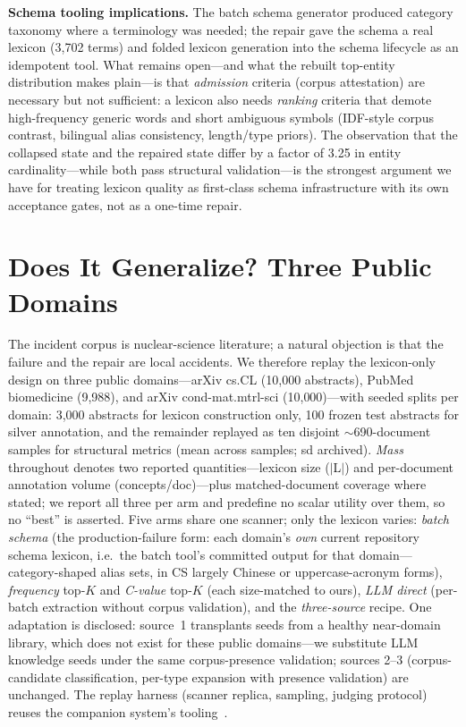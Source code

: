 \documentclass[preprint,12pt]{elsarticle}
\begin{document}
\textbf{Schema tooling implications.} The batch schema generator produced
category taxonomy where a terminology was needed; the repair gave the schema
a real lexicon (3{,}702 terms) and folded lexicon generation into the schema
lifecycle as an idempotent tool. What remains open---and what the rebuilt
top-entity distribution makes plain---is that \emph{admission} criteria
(corpus attestation) are necessary but not sufficient: a lexicon also needs
\emph{ranking} criteria that demote high-frequency generic words and short
ambiguous symbols (IDF-style corpus contrast, bilingual alias consistency,
length/type priors). The observation that the collapsed state and the
repaired state differ by a factor of 3.25 in entity cardinality---while both
pass structural validation---is the strongest argument we have for treating
lexicon quality as first-class schema infrastructure with its own acceptance
gates, not as a one-time repair.

\section{Does It Generalize? Three Public Domains}
\label{sec:xdomain}

The incident corpus is nuclear-science literature; a natural objection is
that the failure and the repair are local accidents. We therefore replay
the lexicon-only design on three public domains---arXiv cs.CL (10{,}000
abstracts), PubMed biomedicine (9{,}988), and arXiv cond-mat.mtrl-sci
(10{,}000)---with seeded splits per domain: 3{,}000 abstracts for lexicon
construction only, 100 frozen test abstracts for silver annotation, and
the remainder replayed as ten disjoint ${\sim}$690-document samples for
structural metrics (mean across samples; sd archived). \emph{Mass}
throughout denotes two reported quantities---lexicon size ($|$L$|$) and
per-document annotation volume (concepts/doc)---plus matched-document
coverage where stated; we report all three per arm and predefine no
scalar utility over them, so no ``best'' is asserted. Five arms share
one scanner; only the lexicon varies: \emph{batch schema} (the
production-failure form: each domain's \emph{own} current repository
schema lexicon, i.e.\ the batch tool's committed output for that
domain---category-shaped alias sets, in CS largely Chinese or
uppercase-acronym forms), \emph{frequency} top-$K$ and \emph{C-value}
top-$K$ (each size-matched to ours), \emph{LLM direct} (per-batch
extraction without corpus validation), and the \emph{three-source}
recipe. One adaptation is disclosed: source~1 transplants seeds from a
healthy near-domain library, which does not exist for these public
domains---we substitute LLM knowledge seeds under the same
corpus-presence validation; sources 2--3 (corpus-candidate
classification, per-type expansion with presence validation) are
unchanged. The replay harness (scanner replica, sampling, judging
protocol) reuses the companion system's tooling~\cite{companion}.
\end{document}
